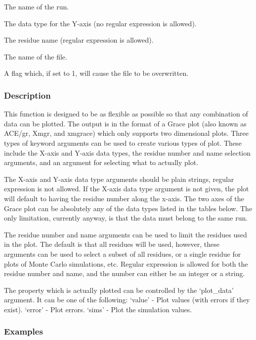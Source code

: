   The name of the run.

  The data type for the Y-axis (no regular expression is allowed).

  The residue name (regular expression is allowed).

  The name of the file.

  A flag which, if set to 1, will cause the file to be overwritten.

\subsubsection{Description}

This function is designed to be as flexible as possible so that any combination of data can
be plotted.  The output is in the format of a Grace plot (also known as ACE/gr, Xmgr, and
xmgrace) which only supports two dimensional plots.  Three types of keyword arguments can
be used to create various types of plot.  These include the X-axis and Y-axis data types,
the residue number and name selection arguments, and an argument for selecting what to
actually plot.

The X-axis and Y-axis data type arguments should be plain strings, regular expression is not
allowed.  If the X-axis data type argument is not given, the plot will default to having the
residue number along the x-axis.  The two axes of the Grace plot can be absolutely any of
the data types listed in the tables below.  The only limitation, currently anyway, is that
the data must belong to the same run.

The residue number and name arguments can be used to limit the residues used in the plot.
The default is that all residues will be used, however, these arguments can be used to
select a subset of all residues, or a single residue for plots of Monte Carlo simulations,
etc.  Regular expression is allowed for both the residue number and name, and the number can
either be an integer or a string.

The property which is actually plotted can be controlled by the `plot\_data' argument.  It
can be one of the following:
    `value' - Plot values (with errors if they exist).
    `error' - Plot errors.
    `sims'   - Plot the simulation values.


\subsubsection{Examples}

